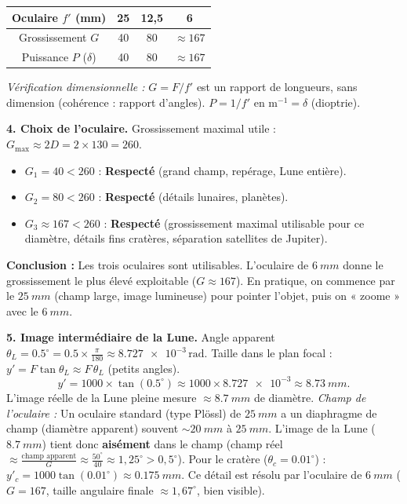\documentclass[11pt]{article}
\begin{document}
\begin{exoresolu}
\begin{center}
\begin{tabular}{|c|c|c|c|}
\hline
\rowcolor{popblueL} Oculaire $f'$ (mm) & 25 & 12,5 & 6 \\ \hline
Grossissement $G$ & 40 & 80 & $\approx 167$ \\ \hline
Puissance $P$ ($\delta$) & 40 & 80 & $\approx 167$ \\ \hline
\end{tabular}
\end{center}
\textit{Vérification dimensionnelle :} $G = F/f'$ est un rapport de longueurs, sans dimension (cohérence : rapport d'angles). $P = 1/f'$ en $\text{m}^{-1} = \delta$ (dioptrie).

\textbf{4. Choix de l'oculaire.}
Grossissement maximal utile : $G_{\max} \approx 2D = 2 \times 130 = 260$.
\begin{itemize}
\item $G_1 = 40 < 260$ : \textbf{Respecté} (grand champ, repérage, Lune entière).
\item $G_2 = 80 < 260$ : \textbf{Respecté} (détails lunaires, planètes).
\item $G_3 \approx 167 < 260$ : \textbf{Respecté} (grossissement maximal utilisable pour ce diamètre, détails fins cratères, séparation satellites de Jupiter).
\end{itemize}
\textbf{Conclusion :} Les trois oculaires sont utilisables. L'oculaire de $\SI{6}{mm}$ donne le grossissement le plus élevé exploitable ($G \approx 167$). En pratique, on commence par le $\SI{25}{mm}$ (champ large, image lumineuse) pour pointer l'objet, puis on « zoome » avec le $\SI{6}{mm}$.

\textbf{5. Image intermédiaire de la Lune.}
Angle apparent $\theta_L = \num{0,5}^{\circ} = \num{0,5} \times \frac{\pi}{180} \approx \num{8,727e-3}\,\text{rad}$.
Taille dans le plan focal : $y' = F \tan\theta_L \approx F\,\theta_L$ (petits angles).
\[ y' = 1000 \times \tan(\num{0,5}^{\circ}) \approx 1000 \times \num{8,727e-3} \approx \SI{8,73}{mm}. \]
L'image réelle de la Lune pleine mesure $\approx \SI{8,7}{mm}$ de diamètre.
\textit{Champ de l'oculaire :} Un oculaire standard (type Plössl) de $\SI{25}{mm}$ a un diaphragme de champ (diamètre apparent) souvent $\sim \SI{20}{mm}$ à $\SI{25}{mm}$. L'image de la Lune ($\SI{8,7}{mm}$) tient donc \textbf{aisément} dans le champ (champ réel $\approx \frac{\text{champ apparent}}{G} \approx \frac{50^{\circ}}{40} \approx 1,25^{\circ} > 0,5^{\circ}$).
Pour le cratère ($\theta_c = \num{0,01}^{\circ}$) : $y'_c = 1000 \tan(\num{0,01}^{\circ}) \approx \SI{0,175}{mm}$. Ce détail est résolu par l'oculaire de $\SI{6}{mm}$ ($G=167$, taille angulaire finale $\approx 1,67^{\circ}$, bien visible).


\end{exoresolu}
\end{document}
